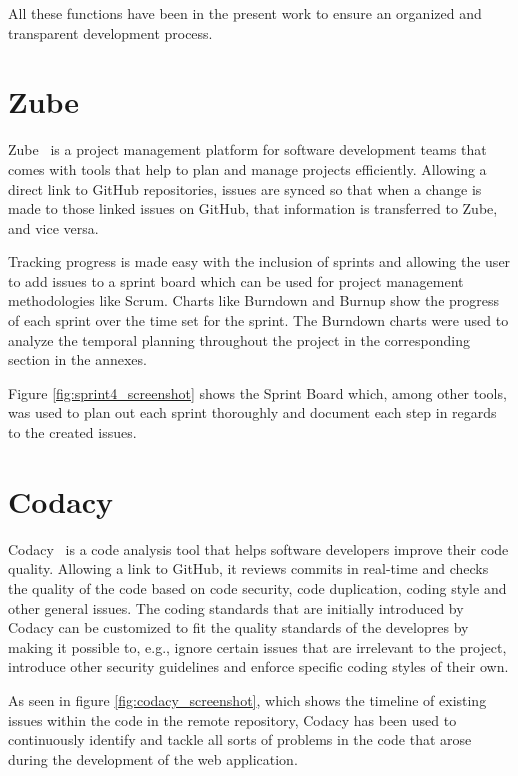 All these functions have been in the present work to ensure an organized and transparent development process.

\section{Zube}
Zube~\cite{zube} is a project management platform for software development teams that comes with tools that help to plan and manage projects efficiently. Allowing a direct link to GitHub repositories, issues are synced so that when a change is made to those linked issues on GitHub, that information is transferred to Zube, and vice versa.

Tracking progress is made easy with the inclusion of sprints and allowing the user to add issues to a sprint board which can be used for project management methodologies like Scrum. Charts like Burndown and Burnup show the progress of each sprint over the time set for the sprint. The Burndown charts were used to analyze the temporal planning throughout the project in the corresponding section in the annexes.

Figure \ref{fig:sprint4_screenshot} shows the Sprint Board which, among other tools, was used to plan out each sprint thoroughly and document each step in regards to the created issues.
\pagebreak
{}
\pagebreak

\section{Codacy} \label{codacy}
Codacy~\cite{codacy} is a code analysis tool that helps software developers improve their code quality. Allowing a link to GitHub, it reviews commits in real-time and checks the quality of the code based on code security, code duplication, coding style and other general issues.
The coding standards that are initially introduced by Codacy can be customized to fit the quality standards of the developres by making it possible to, e.g., ignore certain issues that are irrelevant to the project, introduce other security guidelines and enforce specific coding styles of their own.

As seen in figure \ref{fig:codacy_screenshot}, which shows the timeline of existing issues within the code in the remote repository, Codacy has been used to continuously identify and tackle all sorts of problems in the code that arose during the development of the web application.
